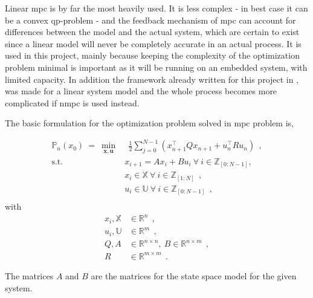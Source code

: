 
Linear \acrshort{mpc} is by far the most heavily used. It is less complex - in best case it can be a convex \acrshort{qp}-problem - and the feedback mechanism of \acrshort{mpc} can account for differences between the model and the actual system, which are certain to exist since a linear model will never be completely accurate in an actual process. It is used in this project, mainly because keeping the complexity of the optimization problem minimal is important as it will be running on an embedded system, with limited capacity. In addition the framework already written for this project in \cite{prosjekt_oppgave}, was made for a linear system model and the whole process becomes more complicated if \acrlong{nmpc} is used instead.

The basic formulation for the optimization problem solved in \acrshort{mpc} problem is,

\begin{equation}\label{eq:MPC_unstable}
    \begin{split}
        \mathbb{P}_n (x_0) \: = \: \min_{\bm x, \bm u} & \: \: \frac{1}{2} \sum_{j=0}^{{N-1}}(x_{n+1}^\top Q x_{n+1 } + u_{n}^\top R u_n) \: \: , \\
        \text{s.t. }    & x_{i+1} = Ax_i + Bu_i \: \forall \: i \in \mathbb{Z}_{[0:N-1]},\\
                        & x_i \in \mathbb{X} \: \forall \: i \in \mathbb{Z}_{[1:N]}  \: \: , \\
                        & u_i \in \mathbb{U} \: \forall \: i \in \mathbb{Z}_{[0:N-1]}    \: \: , \\
    \end{split}
\end{equation}
with 
\begin{equation}\label{eq:MPC_unstable_desc}
    \begin{split}
        x_i, \mathbb{X} &\in \mathbb{R}^n \: \: , \\
        u_i, \mathbb{U} &\in \mathbb{R}^m \: \: , \\
       Q, A &\in \mathbb{R}^{n\times n}, \: B \in \mathbb{R}^{n\times m} \: \: , \\
       R &\in \mathbb{R}^{m \times m} \: \: .
    \end{split}        
\end{equation}

The matrices $A$ and $B$ are the matrices for the state space model for the given system.

